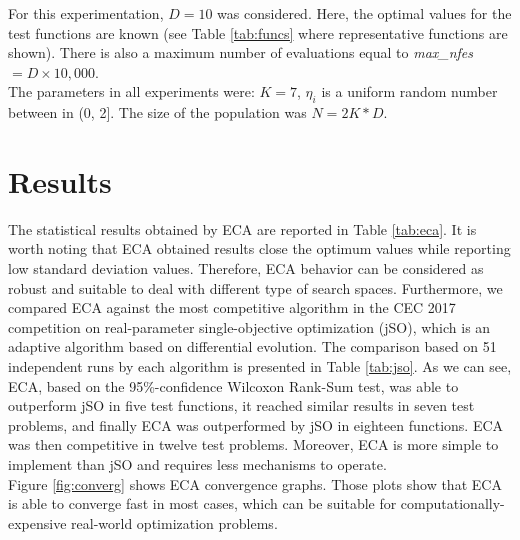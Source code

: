 \documentclass{svproc}
\begin{document}
For this experimentation, $D = 10$ was considered. Here, the optimal values for the test 
functions are known (see Table \ref{tab:funcs} where representative functions are shown). There is also a maximum number of 
evaluations equal to \textit{max\_nfes} $= D \times 10,000$.\\

The parameters in all experiments were: $K = 7$, $\eta_i$ is a uniform random number 
between in (0, 2]. The size of the population was $N = 2K * D $.







\section{Results} %
\label{sec:results}

The statistical results obtained by ECA are reported in Table \ref{tab:eca}. 
It is worth noting  that ECA obtained results close the optimum values 
while reporting low standard deviation values. Therefore, ECA behavior can 
be considered as robust and suitable to deal with different type of search spaces. 
Furthermore, we compared ECA against the most competitive algorithm in 
the CEC 2017 competition on real-parameter single-objective optimization (jSO), 
which is an adaptive algorithm based on differential evolution. The comparison 
based on 51 independent runs by each algorithm is presented in Table \ref{tab:jso}. 
As we can see, ECA, based on the 95\%-confidence Wilcoxon Rank-Sum test, 
was able to outperform jSO in five test functions, it reached similar 
results in seven test problems, and finally ECA was outperformed by jSO 
in eighteen functions. ECA was then competitive in twelve test problems. 
Moreover, ECA is more simple to implement than jSO and requires less 
mechanisms to operate.\\

Figure \ref{fig:converg} shows ECA convergence graphs. Those plots show that 
ECA is able to converge fast in most cases, which can be suitable for 
computationally-expensive real-world optimization problems.  
\end{document}
